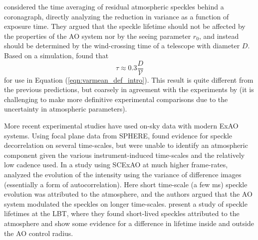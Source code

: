 \documentclass[10pt,preprint]{aastex631}
\begin{document}
\citet{2005SPIE.5903..170M} considered the time averaging of residual atmospheric speckles behind a coronagraph, directly analyzing the reduction in variance as a function of exposure time.  They argued that the speckle lifetime should not be affected by the properties of the AO system nor by the seeing parameter $r_0$, and instead should be determined by the wind-crossing time of a telescope with diameter $D$.  Based on a simulation, \citet{2005SPIE.5903..170M} found that 
\begin{equation}
\tau \approx 0.3 \frac{D}{\mathcal{V}}
\end{equation}
for use in Equation (\ref{eqn:varmean_def_intro}).  This result is quite different from the previous predictions, but coarsely in agreement with the experiments by \citet{2006ApJ...637..541F} (it is challenging to make more definitive experimental comparisons due to the uncertainty in atmospheric parameters).


More recent experimental studies have used on-sky data with modern ExAO systems.  Using focal plane data from SPHERE, \citet{2016SPIE.9909E..4ZM} found evidence for speckle decorrelation on several time-scales, but were unable to identify an atmospheric component given the various instrument-induced time-scales and the relatively low cadence used. In a study using SCExAO at much higher frame-rates, \citet{2018PASP..130j4502G} analyzed the evolution of the intensity using the variance of difference images (essentially a form of autocorrelation).  Here short time-scale (a few ms) speckle evolution was attributed to the atmosphere, and the authors argued that the AO system modulated the speckles on longer time-scales.  \citet{2017JATIS...3b5001S} present a study of speckle lifetimes at the LBT, where they found short-lived speckles attributed to the atmosphere and show some evidence for a difference in lifetime inside and outside the AO control radius.
\end{document}
